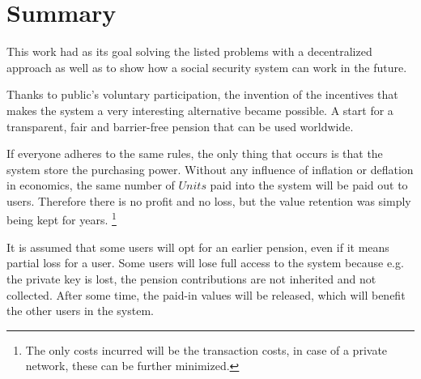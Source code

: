 \section{Summary}

This work had as its goal solving the listed problems with a decentralized approach as well as to show how a social security system can work in the future.

Thanks to public's voluntary participation, the invention of the incentives that makes the system a very interesting alternative became possible. A start for a transparent, fair and barrier-free pension that can be used worldwide.


If everyone adheres to the same rules, the only thing that occurs is that the system store the purchasing power. Without any influence of inflation or deflation in economics, the same number of $Units$ paid into the system will be paid out to users. Therefore there is no profit and no loss, but the value retention was simply being kept for years. \footnote{ The only costs incurred will be the transaction costs, in case of a private network, these can be further minimized.}

It is assumed that some users will opt for an earlier pension, even if it means partial loss for a user. Some users will lose full access to the system because e.g. the private key is lost, the pension contributions are not inherited and not collected. After some time, the paid-in values will be released, which will benefit the other users in the system.


